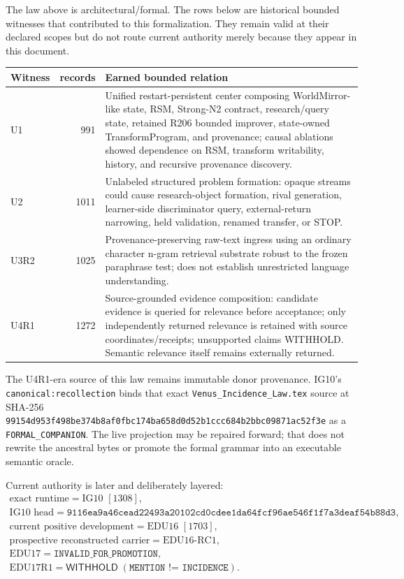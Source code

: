 \documentclass[10pt]{article}
\theoremstyle{venus}
\theoremstyle{definition}
\newcommand{\Withhold}{\mathsf{WITHHOLD}}
\begin{document}
The law above is architectural/formal. The rows below are historical bounded
witnesses that contributed to this formalization. They remain valid at their
declared scopes but do not route current authority merely because they appear in
this document.

\begin{center}
\small
\begin{tabularx}{0.97\linewidth}{@{}l r X@{}}
\toprule
Witness & records & Earned bounded relation \\
\midrule
U1 & 991 & Unified restart-persistent center composing WorldMirror-like state,
RSM, Strong-N2 contract, research/query state, retained R206 bounded improver,
state-owned TransformProgram, and provenance; causal ablations showed dependence
on RSM, transform writability, history, and recursive provenance discovery.\\
U2 & 1011 & Unlabeled structured problem formation: opaque streams could cause
research-object formation, rival generation, learner-side discriminator query,
external-return narrowing, held validation, renamed transfer, or STOP.\\
U3R2 & 1025 & Provenance-preserving raw-text ingress using an ordinary character
n-gram retrieval substrate robust to the frozen paraphrase test; does not establish
unrestricted language understanding.\\
U4R1 & 1272 & Source-grounded evidence composition: candidate evidence is queried
for relevance before acceptance; only independently returned relevance is retained
with source coordinates/receipts; unsupported claims WITHHOLD. Semantic relevance
itself remains externally returned.\\
\bottomrule
\end{tabularx}
\end{center}

The U4R1-era source of this law remains immutable donor provenance. IG10's
\texttt{canonical:recollection} binds that exact
\texttt{Venus\_Incidence\_Law.tex} source at SHA-256
\texttt{99154d953f498be374b8af0fbc174ba658d0d52b1ccc684b2bbc09871ac52f3e}
as a \texttt{FORMAL\_COMPANION}. The live projection may be repaired forward;
that does not rewrite the ancestral bytes or promote the formal grammar into an
executable semantic oracle.

Current authority is later and deliberately layered:
\[
\boxed{
\begin{gathered}
\text{exact runtime}=\text{IG10 }[1308],\\
\text{IG10 head}=\texttt{9116ea9a46cead22493a20102cd0cdee1da64fcf96ae546f1f7a3deaf54b88d3},\\
\text{current positive development}=\text{EDU16 }[1703],\\
\text{prospective reconstructed carrier}=\text{EDU16-RC1},\\
\text{EDU17}=\texttt{INVALID\_FOR\_PROMOTION},\\
\text{EDU17R1}=\Withhold\; (\texttt{MENTION != INCIDENCE}).
\end{gathered}}
\]
\end{document}
